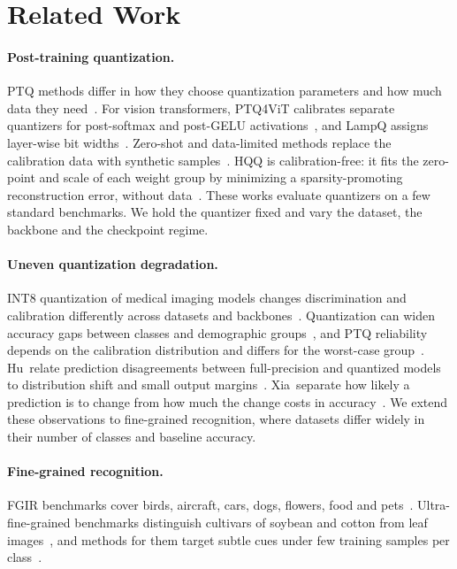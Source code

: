 \section{Related Work}
\label{sec:related}

\paragraph{Post-training quantization.}
PTQ methods differ in how they choose quantization parameters and how much data they need~\cite{gholami2021survey}.
For vision transformers, PTQ4ViT calibrates separate quantizers for post-softmax and post-GELU activations~\cite{yuan2022ptq4vit}, and LampQ assigns layer-wise bit widths~\cite{kim2026lampq}.
Zero-shot and data-limited methods replace the calibration data with synthetic samples~\cite{zhong2022fdda,kim2025synq}.
HQQ is calibration-free: it fits the zero-point and scale of each weight group by minimizing a sparsity-promoting reconstruction error, without data~\cite{badri2023hqq}.
These works evaluate quantizers on a few standard benchmarks.
We hold the quantizer fixed and vary the dataset, the backbone and the checkpoint regime.

\paragraph{Uneven quantization degradation.}
INT8 quantization of medical imaging models changes discrimination and calibration differently across datasets and backbones~\cite{ozdemir2026bridging}.
Quantization can widen accuracy gaps between classes and demographic groups~\cite{liu2025unfairness}, and PTQ reliability depends on the calibration distribution and differs for the worst-case group~\cite{yuan2023benchmarking}.
Hu~\etal relate prediction disagreements between full-precision and quantized models to distribution shift and small output margins~\cite{hu2023towards}.
Xia~\etal separate how likely a prediction is to change from how much the change costs in accuracy~\cite{xia2021underexplored}.
We extend these observations to fine-grained recognition, where datasets differ widely in their number of classes and baseline accuracy.

\paragraph{Fine-grained recognition.}
FGIR benchmarks cover birds, aircraft, cars, dogs, flowers, food and pets~\cite{wah2011cub,maji2013fine,krause2013cars,khosla2011dogs,nilsback2008flowers,bossard2014food,parkhi2012pets}.
Ultra-fine-grained benchmarks distinguish cultivars of soybean and cotton from leaf images~\cite{yu2021benchmark}, and methods for them target subtle cues under few training samples per class~\cite{fang2024learning}.

